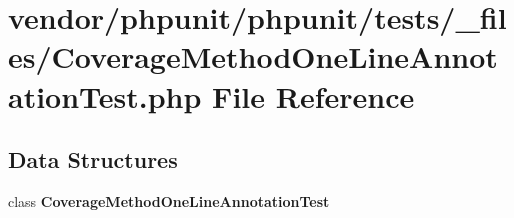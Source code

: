 \section{vendor/phpunit/phpunit/tests/\+\_\+files/\+Coverage\+Method\+One\+Line\+Annotation\+Test.php File Reference}
\label{phpunit_2tests_2__files_2_coverage_method_one_line_annotation_test_8php}
\subsection*{Data Structures}
\begin{DoxyCompactItemize}
\item 
class {\bf Coverage\+Method\+One\+Line\+Annotation\+Test}
\end{DoxyCompactItemize}
